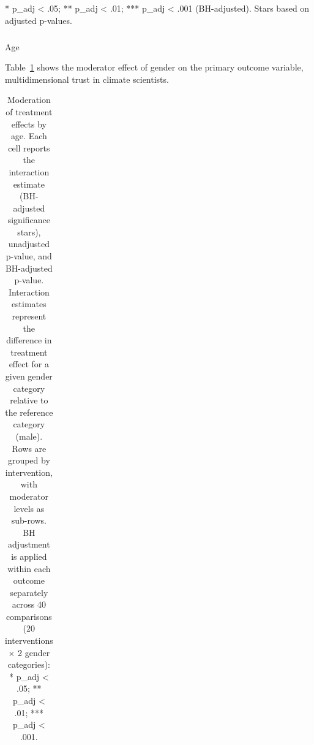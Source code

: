 \documentclass[
  letterpaper,
  DIV=11,
  numbers=noendperiod]{scrartcl}
\makeatletter
\let\oldsubparagraph\subparagraph
\renewcommand{\subparagraph}{
    \@ifstar
      \xxxSubParagraphStar
      \xxxSubParagraphNoStar
  }
\newcommand{\xxxSubParagraphStar}[1]{\oldsubparagraph*{#1}\mbox{}}
\newcommand{\xxxSubParagraphNoStar}[1]{\oldsubparagraph{#1}\mbox{}}
\makeatother
\begin{document}
\begin{minipage}{\linewidth}
* p\_adj < .05; ** p\_adj < .01; *** p\_adj < .001 (BH-adjusted). Stars based on adjusted p-values.\\
\end{minipage}
\endgroup

\subparagraph{Age}\label{age}

Table~\ref{tbl-age-primary-outcome} shows the moderator effect of gender
on the primary outcome variable, multidimensional trust in climate
scientists.

\begingroup
\fontsize{7.5pt}{9.0pt}\selectfont
\setlength{\LTpost}{0mm}

\begin{longtable}{l|l}

\caption{\label{tbl-age-primary-outcome}Moderation of treatment effects
by age. Each cell reports the interaction estimate (BH-adjusted
significance stars), unadjusted p-value, and BH-adjusted p-value.
Interaction estimates represent the difference in treatment effect for a
given gender category relative to the reference category (male). Rows
are grouped by intervention, with moderator levels as sub-rows. BH
adjustment is applied within each outcome separately across 40
comparisons (20 interventions × 2 gender categories): * p\_adj
\textless{} .05; ** p\_adj \textless{} .01; *** p\_adj \textless{}
.001.}

\tabularnewline


\end{longtable}
\end{document}
